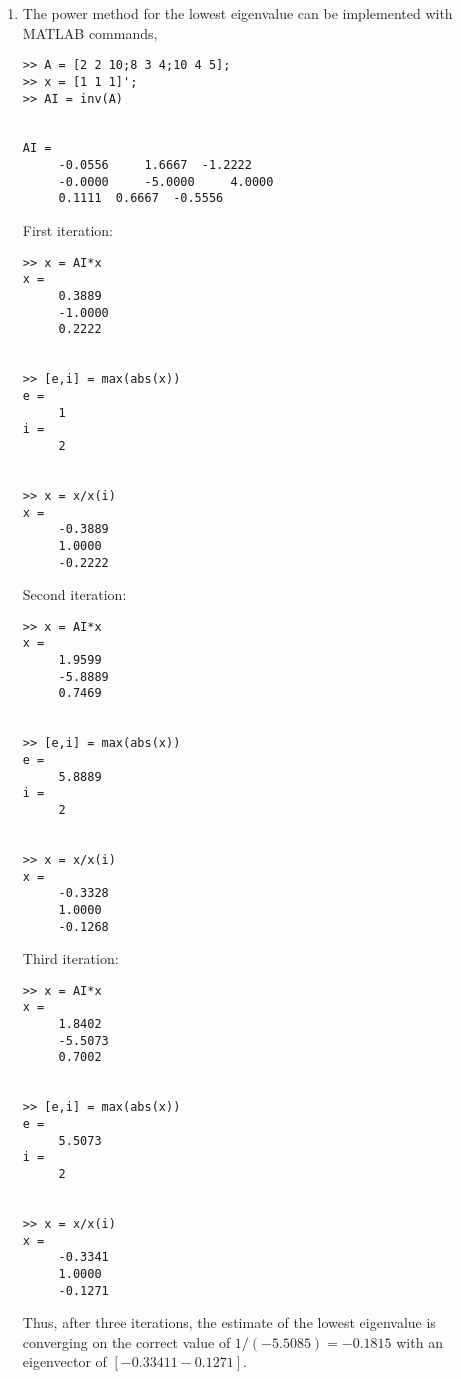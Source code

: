 \documentclass[../main.tex]{subfiles}
\begin{document}
\begin{enumerate}[label=\bfseries(\alph*)]
\begin{lstlisting}[numbers=none]
>> e = max(x)
e =
	 16.5661


>> x = x/e
x =
	 0.8005
	 0.7905
	 1.0000 
\end{lstlisting}
	\bigbreak
Fourth iteration:
	\bigbreak
\begin{lstlisting}[numbers=none]
>> x = A*x
x =
	 13.1819
	 12.7753
	 16.1668


>> e = max(x)
e =
	 16.1668


>> x = x/e
x =
	 0.8154
	 0.7902
	 1.0000 
\end{lstlisting}
	\bigbreak
\begin{blockquote}
Thus, after four iterations, the result is converging on a highest eigenvalue of 16.2741 with
a corresponding eigenvector of [0.811 0.790 1]. 
\end{blockquote}
	\bigbreak
\item The power method for the lowest eigenvalue can be implemented with MATLAB commands,
	\bigbreak
\begin{lstlisting}[numbers=none]
>> A = [2 2 10;8 3 4;10 4 5];
>> x = [1 1 1]';
>> AI = inv(A)


AI =
	 -0.0556	 1.6667	 -1.2222
	 -0.0000	 -5.0000	 4.0000
	 0.1111	 0.6667	 -0.5556 
\end{lstlisting}
	\bigbreak
First iteration:
	\bigbreak
\begin{lstlisting}[numbers=none]
>> x = AI*x
x =
	 0.3889
	 -1.0000
	 0.2222


>> [e,i] = max(abs(x))
e =
	 1
i =
	 2


>> x = x/x(i)
x =
	 -0.3889
	 1.0000
	 -0.2222 
\end{lstlisting}
	\bigbreak
Second iteration:
	\bigbreak
\begin{lstlisting}[numbers=none]
>> x = AI*x
x =
	 1.9599
	 -5.8889
	 0.7469


>> [e,i] = max(abs(x))
e =
	 5.8889
i =
	 2


>> x = x/x(i)
x =
	 -0.3328
	 1.0000
	 -0.1268 
\end{lstlisting}
	\bigbreak
Third iteration:
	\bigbreak
\begin{lstlisting}[numbers=none]
>> x = AI*x
x =
	 1.8402
	 -5.5073
	 0.7002


>> [e,i] = max(abs(x))
e =
	 5.5073
i =
	 2


>> x = x/x(i)
x =
	 -0.3341
	 1.0000
	 -0.1271
\end{lstlisting}
	\bigbreak
Thus, after three iterations, the estimate of the lowest eigenvalue is converging on the correct value of $1 /(-5.5085)=-0.1815$ with an eigenvector of $[-0.33411-0.1271]$.
	\bigbreak
\end{enumerate}
\end{document}
